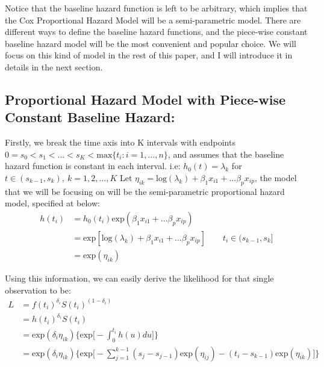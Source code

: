 \documentclass[]{article}
\begin{document}
Notice that the baseline hazard function is left to be arbitrary, which
implies that the Cox Proportional Hazard Model will be a semi-parametric
model. There are different ways to define the baseline hazard functions,
and the piece-wise constant baseline hazard model will be the most
convenient and popular choice. We will focus on this kind of model in
the rest of this paper, and I will introduce it in details in the next
section.

\hypertarget{proportional-hazard-model-with-piece-wise-constant-baseline-hazard}{%
\subsection{Proportional Hazard Model with Piece-wise Constant Baseline
Hazard:}\label{proportional-hazard-model-with-piece-wise-constant-baseline-hazard}}

Firstly, we break the time axis into K intervals with endpoints
\(0=s_0<s_1<...<s_K < \text{max}\{t_i:i=1,...,n\}\), and assumes that
the baseline hazard function is constant in each interval. i.e:
\(h_0(t) = \lambda_k\) for \(t\in(s_{k-1},s_k), \ k=1,2, ...,K\) Let
\(\eta_{ik} = \text{log}(\lambda_k)+\beta_1x_{i1}+...\beta_px_{ip}\),
the model that we will be focusing on will be the semi-parametric
proportional hazard model, specified at below:
\begin{equation}\begin{aligned}\label{eqn:phmodel}
h(t_i) &= h_0(t_i)\text{exp}(\beta_1x_{i1}+...\beta_px_{ip})\\
       &= \text{exp}[\text{log}(\lambda_k)+\beta_1x_{i1}+...\beta_px_{ip}] \qquad t_i\in(s_{k-1},s_k] \\
       &= \text{exp}(\eta_{ik})
\end{aligned}\end{equation}

Using this information, we can easily derive the likelihood for that
single observation to be:
\begin{equation}\begin{aligned}\label{eqn:singlelike}
L &= f(t_i)^{\delta_i}S(t_i)^{(1- \delta_i)}\\
  &= h(t_i)^{\delta_i}S(t_i) \\
  &= \text{exp}(\delta_i \eta_{ik})\bigg\{ \text{exp} \big[ -\int_{0}^{t_i} h(u) du\big ] \bigg\} \\
  &= \text{exp}(\delta_i \eta_{ik})\bigg \{\text{exp}\big[-\sum_{j=1}^{k-1} (s_{j}-s_{j-1})\text {exp} (\eta_{ij}) - (t_i-s_{k-1})\text{exp}(\eta_{ik})\big]\bigg \}\\
\end{aligned}\end{equation}
\end{document}
